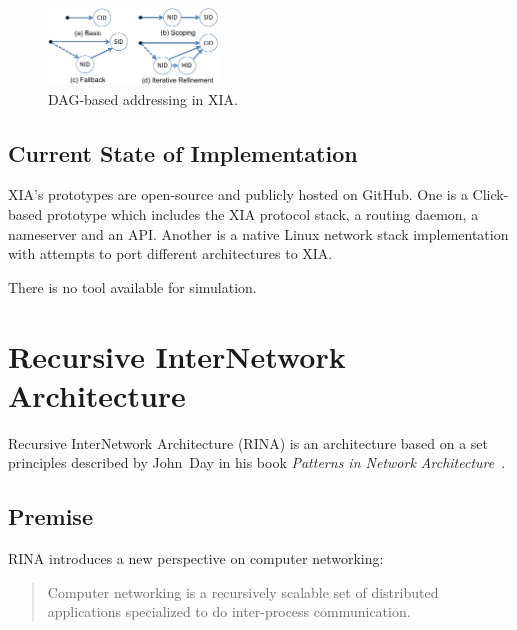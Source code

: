                 \begin{figure}[H]
                    \begin{center}
                        \includegraphics[width=0.4\textwidth]{fig/archs_xia-dag.pdf}
                        \caption{DAG-based addressing in XIA.}
                        \label{fig:xia_dag}
                    \end{center}
                \end{figure}

        \subsection{Current State of Implementation}

            XIA's prototypes are open-source and publicly hosted on GitHub. One is a Click-based prototype which includes the XIA protocol stack, a routing daemon, a nameserver and an API. Another is a native Linux network stack implementation with attempts to port different architectures to XIA.

            There is no tool available for simulation.

    \section{Recursive InterNetwork Architecture}\label{archs:rina}

        Recursive InterNetwork Architecture (RINA) is an architecture based on a set principles described by John~Day in his book \emph{Patterns in Network Architecture}~\cite{Patterns}.

        \subsection{Premise}

            RINA introduces a new perspective on computer networking:

            \begin{quotation}
                \centering
                Computer networking is a recursively scalable set of distributed applications specialized to do inter-process communication.
            \end{quotation}

